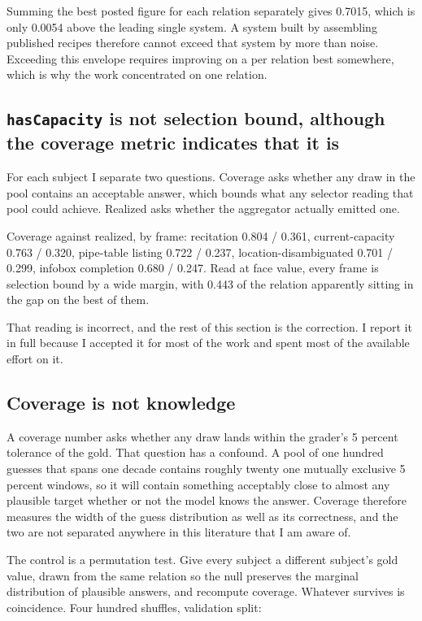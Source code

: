 \documentclass[11pt]{article}
\begin{document}
Summing the best posted figure for each relation separately gives 0.7015, which
is only 0.0054 above the leading single system. A system built by assembling
published recipes therefore cannot exceed that system by more than noise.
Exceeding this envelope requires improving on a per relation best somewhere,
which is why the work concentrated on one relation.

\subsection{\texttt{hasCapacity} is not selection bound, although the coverage
metric indicates that it is}
\label{sec:coverage}

For each subject I separate two questions. Coverage asks whether any draw in the
pool contains an acceptable answer, which bounds what any selector reading that
pool could achieve. Realized asks whether the aggregator actually emitted one.

Coverage against realized, by frame: recitation 0.804 / 0.361, current-capacity
0.763 / 0.320, pipe-table listing 0.722 / 0.237, location-disambiguated 0.701 /
0.299, infobox completion 0.680 / 0.247. Read at face value, every frame is
selection bound by a wide margin, with 0.443 of the relation apparently sitting
in the gap on the best of them.

That reading is incorrect, and the rest of this section is the correction. I
report it in full because I accepted it for most of the work and spent most of
the available effort on it.

\subsection{Coverage is not knowledge}
\label{sec:cinm}

A coverage number asks whether any draw lands within the grader's 5 percent
tolerance of the gold. That question has a confound. A pool of one hundred
guesses that spans one decade contains roughly twenty one mutually exclusive 5
percent windows, so it will contain something acceptably close to almost any
plausible target whether or not the model knows the answer. Coverage therefore
measures the width of the guess distribution as well as its correctness, and the
two are not separated anywhere in this literature that I am aware of.

The control is a permutation test. Give every subject a different subject's gold
value, drawn from the same relation so the null preserves the marginal
distribution of plausible answers, and recompute coverage. Whatever survives is
coincidence. Four hundred shuffles, validation split:
\end{document}

